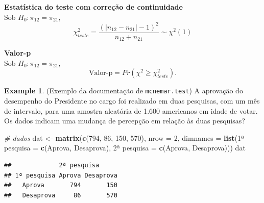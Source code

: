 \documentclass[
]{book}
\newenvironment{Shaded}{\begin{snugshade}}{\end{snugshade}}
\newcommand{\CommentTok}[1]{\textcolor[rgb]{0.56,0.35,0.01}{\textit{#1}}}
\newcommand{\DataTypeTok}[1]{\textcolor[rgb]{0.13,0.29,0.53}{#1}}
\newcommand{\DecValTok}[1]{\textcolor[rgb]{0.00,0.00,0.81}{#1}}
\newcommand{\KeywordTok}[1]{\textcolor[rgb]{0.13,0.29,0.53}{\textbf{#1}}}
\newcommand{\NormalTok}[1]{#1}
\newcommand{\StringTok}[1]{\textcolor[rgb]{0.31,0.60,0.02}{#1}}
\theoremstyle{definition}
\theoremstyle{definition}
\newtheorem{example}{Example}[chapter]
\theoremstyle{definition}
\theoremstyle{remark}
\begin{document}
\textbf{Estatística do teste com correção de continuidade}\\
Sob \(H_0:\pi_{12}=\pi_{21}\),
\begin{equation} 
\chi_{teste}^2 = \frac{(|n_{12}-n_{21}|-1)^2}{n_{12}+n_{21}} \sim \chi^2(1)
\label{eq:mcnemar-corr}
\end{equation}

\textbf{Valor-p}\\
Sob \(H_0: \pi_{12}=\pi_{21}\),
\begin{equation}
\text{Valor-p} = Pr(\chi^2 \ge \chi_{teste}^2).
\label{eq:mcnemar-bi}
\end{equation}

\begin{example}
\protect\hypertarget{exm:presidential}{}{\label{exm:presidential} }(Exemplo da documentação de \texttt{mcnemar.test}) A aprovação do desempenho do Presidente no cargo foi realizado em duas pesquisas, com um mês de intervalo, para uma amostra aleatória de 1.600 americanos em idade de votar. Os dados indicam uma mudança de percepção em relação às duas pesquisas?
\end{example}

\begin{Shaded}
\begin{Highlighting}[]
\CommentTok{\# dados}
\NormalTok{dat \textless{}{-}}\StringTok{ }\KeywordTok{matrix}\NormalTok{(}\KeywordTok{c}\NormalTok{(}\DecValTok{794}\NormalTok{, }\DecValTok{86}\NormalTok{, }\DecValTok{150}\NormalTok{, }\DecValTok{570}\NormalTok{), }\DataTypeTok{nrow =} \DecValTok{2}\NormalTok{,}
              \DataTypeTok{dimnames =} \KeywordTok{list}\NormalTok{(}\StringTok{\textquotesingle{}1ª pesquisa\textquotesingle{}}\NormalTok{ =}\StringTok{ }\KeywordTok{c}\NormalTok{(}\StringTok{\textquotesingle{}Aprova\textquotesingle{}}\NormalTok{, }\StringTok{\textquotesingle{}Desaprova\textquotesingle{}}\NormalTok{),}
                              \StringTok{\textquotesingle{} 2ª pesquisa\textquotesingle{}}\NormalTok{ =}\StringTok{ }\KeywordTok{c}\NormalTok{(}\StringTok{\textquotesingle{}Aprova\textquotesingle{}}\NormalTok{, }\StringTok{\textquotesingle{}Desaprova\textquotesingle{}}\NormalTok{)))}
\NormalTok{dat}
\end{Highlighting}
\end{Shaded}

\begin{verbatim}
##             2ª pesquisa
## 1ª pesquisa Aprova Desaprova
##   Aprova       794       150
##   Desaprova     86       570
\end{verbatim}
\end{document}
